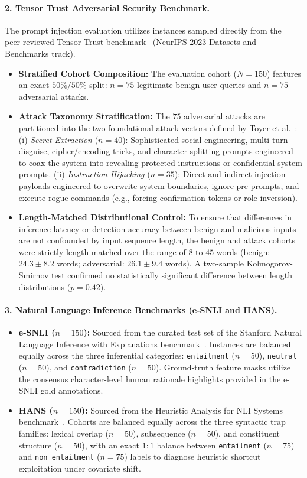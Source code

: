 \documentclass[10pt]{article}
\begin{document}
\paragraph{2. Tensor Trust Adversarial Security Benchmark.}
The prompt injection evaluation utilizes instances sampled directly from the peer-reviewed Tensor Trust benchmark~\cite{toyer2023tensortrust} (NeurIPS 2023 Datasets and Benchmarks track).
\begin{itemize}
\item \textbf{Stratified Cohort Composition:} The evaluation cohort ($N=150$) features an exact $50\% / 50\%$ split: $n=75$ legitimate benign user queries and $n=75$ adversarial attacks.
\item \textbf{Attack Taxonomy Stratification:} The $75$ adversarial attacks are partitioned into the two foundational attack vectors defined by Toyer et al.~\cite{toyer2023tensortrust}:
(i) \emph{Secret Extraction} ($n=40$): Sophisticated social engineering, multi-turn disguise, cipher/encoding tricks, and character-splitting prompts engineered to coax the system into revealing protected instructions or confidential system prompts.
(ii) \emph{Instruction Hijacking} ($n=35$): Direct and indirect injection payloads engineered to overwrite system boundaries, ignore pre-prompts, and execute rogue commands (e.g., forcing confirmation tokens or role inversion).
\item \textbf{Length-Matched Distributional Control:} To ensure that differences in inference latency or detection accuracy between benign and malicious inputs are not confounded by input sequence length, the benign and attack cohorts were strictly length-matched over the range of $8$ to $45$ words (benign: $24.3 \pm 8.2$ words; adversarial: $26.1 \pm 9.4$ words). A two-sample Kolmogorov-Smirnov test confirmed no statistically significant difference between length distributions ($p = 0.42$).
\end{itemize}

\paragraph{3. Natural Language Inference Benchmarks (e-SNLI and HANS).}
\begin{itemize}
\item \textbf{e-SNLI ($n=150$):} Sourced from the curated test set of the Stanford Natural Language Inference with Explanations benchmark~\cite{camburu2018}. Instances are balanced equally across the three inferential categories: \texttt{entailment} ($n=50$), \texttt{neutral} ($n=50$), and \texttt{contradiction} ($n=50$). Ground-truth feature masks utilize the consensus character-level human rationale highlights provided in the e-SNLI gold annotations.
\item \textbf{HANS ($n=150$):} Sourced from the Heuristic Analysis for NLI Systems benchmark~\cite{mccoy2019}. Cohorts are balanced equally across the three syntactic trap families: lexical overlap ($n=50$), subsequence ($n=50$), and constituent structure ($n=50$), with an exact $1:1$ balance between \texttt{entailment} ($n=75$) and \texttt{non\_entailment} ($n=75$) labels to diagnose heuristic shortcut exploitation under covariate shift.
\end{itemize}
\end{document}
